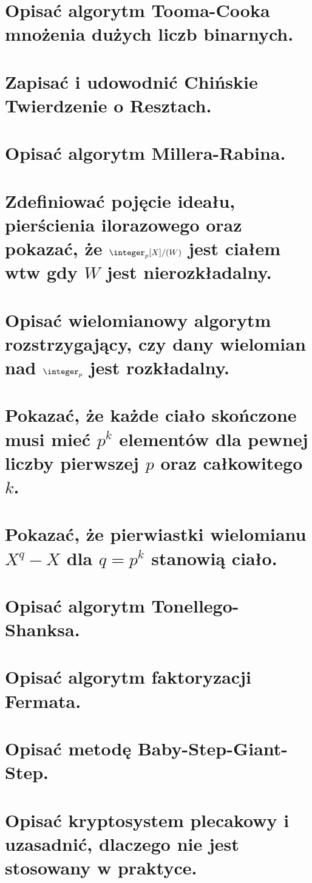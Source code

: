 \section{Opisać algorytm Tooma-Cooka mnożenia dużych liczb binarnych.}


\section{Zapisać i udowodnić Chińskie Twierdzenie o Resztach.}


\section{Opisać algorytm Millera-Rabina.}


\section{Zdefiniować pojęcie ideału, pierścienia ilorazowego oraz pokazać, że \( \integer_p[X]/(W) \) jest ciałem wtw gdy \( W \) jest nierozkładalny.}


\section{Opisać wielomianowy algorytm rozstrzygający, czy dany wielomian nad \(\integer_p\) jest rozkładalny.}


\section{Pokazać, że każde ciało skończone musi mieć \( p^k \) elementów dla pewnej liczby pierwszej \(p\) oraz całkowitego \(k\).}


\section{Pokazać, że pierwiastki wielomianu \( X^q - X \) dla \(q = p^k\) stanowią ciało.}


\section{Opisać algorytm Tonellego-Shanksa.}


\section{Opisać algorytm faktoryzacji Fermata.}


\section{Opisać metodę Baby-Step-Giant-Step.}


\section{Opisać kryptosystem plecakowy i uzasadnić, dlaczego nie jest stosowany w praktyce.}

